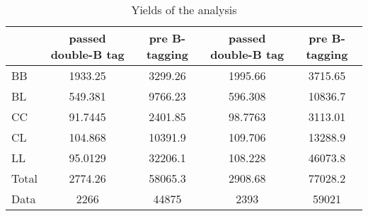 \documentclass[10pt]{article}
\begin{document}
\begin{table}[htbp]
\begin{center}
\begin{tabular}{|l|S|S|S|S|}
\hline 
 & {passed double-B tag} & {pre B-tagging} & {passed double-B tag} & {pre B-tagging}\\
\hline 
  BB   & 1933.25  & 3299.26  & 1995.66  & 3715.65  \\ 
  BL   & 549.381  & 9766.23  & 596.308  & 10836.7  \\ 
  CC   & 91.7445  & 2401.85  & 98.7763  & 3113.01  \\ 
  CL   & 104.868  & 10391.9  & 109.706  & 13288.9  \\ 
  LL   & 95.0129  & 32206.1  & 108.228  & 46073.8  \\ 
\hline 
  Total  & 2774.26  & 58065.3  & 2908.68  & 77028.2  \\ 
\hline 
  Data   & 2266 & 44875 & 2393 & 59021 \\ 
\hline 
\end{tabular} 
\caption{Yields of the analysis} 
\end{center} 
\end{table} 
\end{document}
